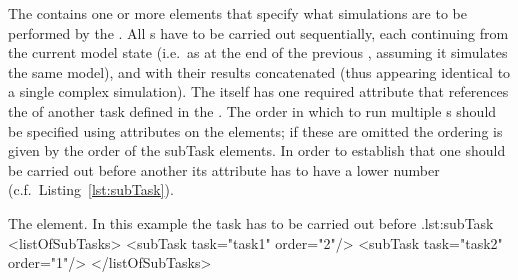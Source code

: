 The  contains one or more  elements that specify what simulations are to be performed by the .
All s have to be carried out sequentially, each continuing from the current model state (i.e.\ as at the end of the previous , assuming it simulates the same model), and with their results concatenated (thus appearing identical to a single complex simulation).
The  itself has one required attribute  that references the  of another task defined in the .
The order in which to run multiple s should be specified using  attributes on the  elements; if these are omitted the ordering is given by the order of the subTask elements.
In order to establish that one  should be carried out before another its  attribute has to have a lower number (c.f.\ Listing~\ref{lst:subTask}).

\begin{myXmlLst}{The  element. In this example the task  has to be carried out before .}{lst:subTask}
  <listOfSubTasks>
    <subTask task="task1" order="2"/> 
    <subTask task="task2" order="1"/> 
  </listOfSubTasks>
\end{myXmlLst}

